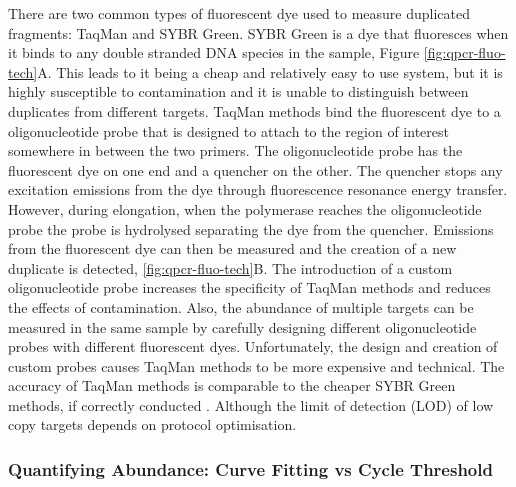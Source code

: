 \documentclass[../main.tex]{subfiles}
\begin{document}
There are two common types of fluorescent dye used to measure duplicated fragments: TaqMan and SYBR Green.
SYBR Green is a dye that fluoresces when it binds to any double stranded DNA species in the sample, Figure \ref{fig:qpcr-fluo-tech}A.
This leads to it being a cheap and relatively easy to use system, but it is highly susceptible to contamination and it is unable to distinguish between duplicates from different targets. 
TaqMan methods bind the fluorescent dye to a oligonucleotide probe that is designed to attach to the region of interest somewhere in between the two primers. 
The oligonucleotide probe has the fluorescent dye on one end and a quencher on the other.
The quencher stops any excitation emissions from the dye through fluorescence resonance energy transfer. 
However, during elongation, when the polymerase reaches the oligonucleotide probe the probe is hydrolysed separating the dye from the quencher.
Emissions from the fluorescent dye can then be measured and the creation of a new duplicate is detected, \ref{fig:qpcr-fluo-tech}B. 
The introduction of a custom oligonucleotide probe increases the specificity of TaqMan methods and reduces the effects of contamination. 
Also, the abundance of multiple targets can be measured in the same sample by carefully designing different oligonucleotide probes with different fluorescent dyes.
Unfortunately, the design and creation of custom probes causes TaqMan methods to be more expensive and technical. 
The accuracy of TaqMan methods is comparable to the cheaper SYBR Green methods, if correctly conducted \parencite{Tajadini2014}.
Although the limit of detection (LOD) of low copy targets depends on protocol optimisation. 

\subsubsection{Quantifying Abundance: Curve Fitting vs Cycle Threshold}
\end{document}
